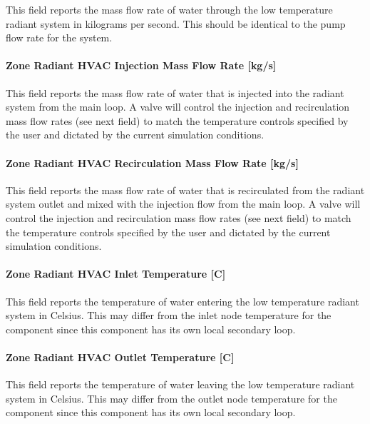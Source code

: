 This field reports the mass flow rate of water through the low temperature radiant system in kilograms per second. This should be identical to the pump flow rate for the system.

\paragraph{Zone Radiant HVAC Injection Mass Flow Rate {[}kg/s{]}}\label{zone-radiant-hvac-injection-mass-flow-rate-kgs}

This field reports the mass flow rate of water that is injected into the radiant system from the main loop. A valve will control the injection and recirculation mass flow rates (see next field) to match the temperature controls specified by the user and dictated by the current simulation conditions.

\paragraph{Zone Radiant HVAC Recirculation Mass Flow Rate {[}kg/s{]}}\label{zone-radiant-hvac-recirculation-mass-flow-rate-kgs}

This field reports the mass flow rate of water that is recirculated from the radiant system outlet and mixed with the injection flow from the main loop. A valve will control the injection and recirculation mass flow rates (see next field) to match the temperature controls specified by the user and dictated by the current simulation conditions.

\paragraph{Zone Radiant HVAC Inlet Temperature {[}C{]}}\label{zone-radiant-hvac-inlet-temperature-c-1}

This field reports the temperature of water entering the low temperature radiant system in Celsius. This may differ from the inlet node temperature for the component since this component has its own local secondary loop.

\paragraph{Zone Radiant HVAC Outlet Temperature {[}C{]}}\label{zone-radiant-hvac-outlet-temperature-c-1}

This field reports the temperature of water leaving the low temperature radiant system in Celsius. This may differ from the outlet node temperature for the component since this component has its own local secondary loop.

